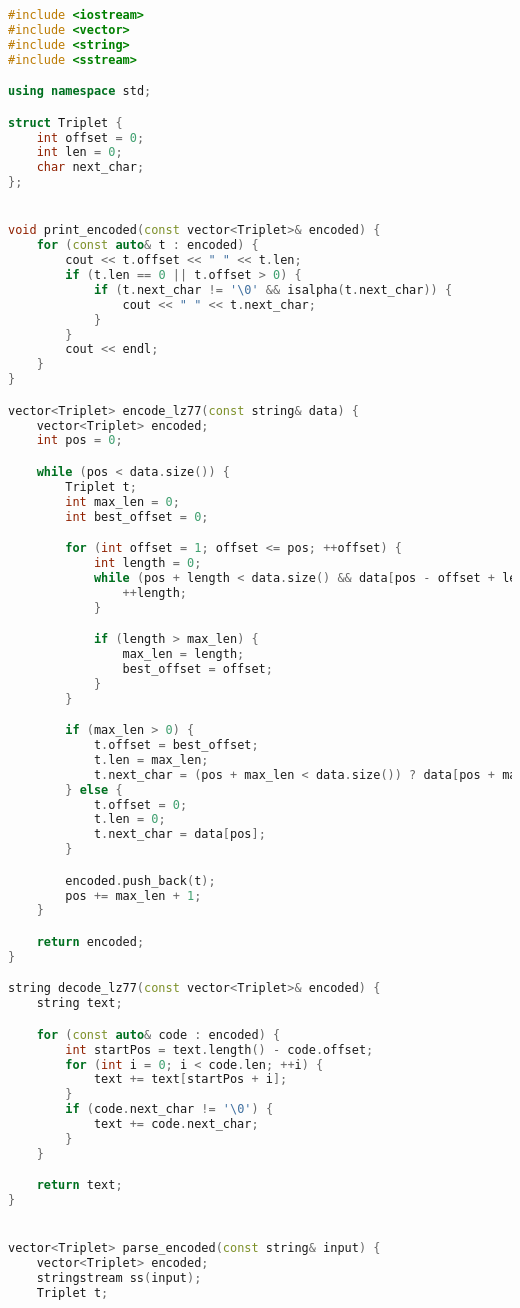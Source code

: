 \begin{lstlisting}[language=C++]
#include <iostream>
#include <vector>
#include <string>
#include <sstream>

using namespace std;

struct Triplet {
    int offset = 0;  
    int len = 0;      
    char next_char;   
};


void print_encoded(const vector<Triplet>& encoded) {
    for (const auto& t : encoded) {
        cout << t.offset << " " << t.len;
        if (t.len == 0 || t.offset > 0) {
            if (t.next_char != '\0' && isalpha(t.next_char)) {
                cout << " " << t.next_char;
            }
        }
        cout << endl;
    }
}

vector<Triplet> encode_lz77(const string& data) {
    vector<Triplet> encoded;
    int pos = 0;

    while (pos < data.size()) {
        Triplet t;
        int max_len = 0;
        int best_offset = 0;

        for (int offset = 1; offset <= pos; ++offset) {
            int length = 0;
            while (pos + length < data.size() && data[pos - offset + length] == data[pos + length]) {
                ++length;
            }

            if (length > max_len) {
                max_len = length;
                best_offset = offset;
            }
        }

        if (max_len > 0) {
            t.offset = best_offset;
            t.len = max_len;
            t.next_char = (pos + max_len < data.size()) ? data[pos + max_len] : '\0';
        } else {
            t.offset = 0;
            t.len = 0;
            t.next_char = data[pos];
        }

        encoded.push_back(t);
        pos += max_len + 1;
    }

    return encoded;
}

string decode_lz77(const vector<Triplet>& encoded) {
    string text;

    for (const auto& code : encoded) {
        int startPos = text.length() - code.offset;
        for (int i = 0; i < code.len; ++i) {
            text += text[startPos + i];
        }
        if (code.next_char != '\0') {
            text += code.next_char;
        }
    }

    return text;
}


vector<Triplet> parse_encoded(const string& input) {
    vector<Triplet> encoded;
    stringstream ss(input);
    Triplet t;


\end{lstlisting}
